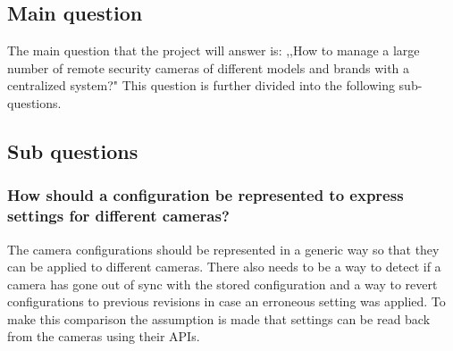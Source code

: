
\subsection{Main question}
The main question that the project will answer is: ,,How to manage a large number of remote security cameras of different models and brands with a centralized system?"
This question is further divided into the following sub-questions.

\subsection{Sub questions}
\subsubsection{How should a configuration be represented to express settings for different cameras?}
The camera configurations should be represented in a generic way so that they can be applied to different cameras. There also needs to be a way to detect if a camera
has gone out of sync with the stored configuration and a way to revert configurations to previous revisions in case an erroneous setting was applied. To make this comparison the assumption is made that settings can be read back from the cameras using their APIs.

